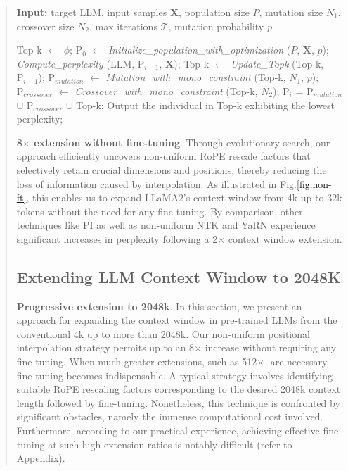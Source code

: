 \begin{abstract}
\begin{algorithm}[t]
	\small
	\caption{The search algorithm}
	\textbf{Input:} target LLM, input samples $\mathbf{X}$, population size $P$, mutation size $N_1$, crossover size $N_2$, max iterations $\mathcal{T}$, mutation probability $p$\\

	\begin{algorithmic}[1]
		\label{alg:search}
		\STATE Top-k $\leftarrow$ $\phi$;	
		\STATE $\text{P}_0$ $\leftarrow$ \textit{Initialize\_population\_with\_optimization} ($P$, $\mathbf{X}$, $p$); 
		\STATE \textit{Compute\_perplexity} (LLM, $\text{P}_{i-1}$, $\mathbf{X}$);
		\STATE Top-k $\leftarrow$ \textit{Update\_Topk} (Top-k, $\text{P}_{i-1}$);
		\STATE $\text{P}_{mutation}$ $\leftarrow$ \textit{Mutation\_with\_mono\_constraint} (Top-k, $N_1$, $p$);
		\STATE $\text{P}_{crossover}$ $\leftarrow$ \textit{Crossover\_with\_mono\_constraint} (Top-k, $N_2$);
		\STATE $\text{P}_i$ = $\text{P}_{mutation}$ $\cup$ $\text{P}_{crossover}$ $\cup$ Top-k;
		\ENDFOR
		\STATE Output the individual in Top-k exhibiting the lowest perplexity;
	\end{algorithmic}
\end{algorithm}

\textbf{8$\times$ extension without fine-tuning}. Through evolutionary search, our approach efficiently uncovers non-uniform RoPE rescale factors that selectively retain crucial dimensions and positions, thereby reducing the loss of information caused by interpolation. As illustrated in Fig.\ref{fig:non-ft}, this enables us to expand LLaMA2’s context window from 4k up to 32k tokens without the need for any fine-tuning. By comparison, other techniques like PI as well as non-uniform NTK and YaRN experience significant increases in perplexity following a 2$\times$ context window extension.

\subsection{Extending LLM Context Window to 2048K}
\label{sec:extendto2048k}

\textbf{Progressive extension to 2048k}. In this section, we present an approach for expanding the context window in pre-trained LLMs from the conventional 4k up to more than 2048k. Our non-uniform positional interpolation strategy permits up to an 8$\times$ increase without requiring any fine-tuning. When much greater extensions, such as 512$\times$, are necessary, fine-tuning becomes indispensable. A typical strategy involves identifying suitable RoPE rescaling factors corresponding to the desired 2048k context length followed by fine-tuning. Nonetheless, this technique is confronted by significant obstacles, namely the immense computational cost involved. Furthermore, according to our practical experience, achieving effective fine-tuning at such high extension ratios is notably difficult (refer to Appendix).


\end{abstract}
